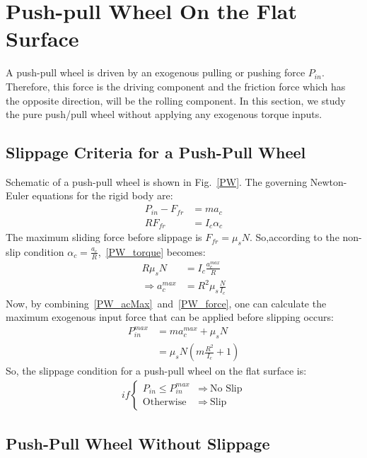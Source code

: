 \documentclass[letterpaper, 10pt, conference]{ieeeconf}
\begin{document}
\section{Push-pull Wheel On the Flat Surface}
A push-pull wheel is driven by an exogenous pulling or pushing force $P_{in}$. Therefore, this force is the driving component and the friction force which has the opposite direction, will be the rolling component. In this section, we study the pure push/pull wheel without applying any exogenous torque inputs.

\subsection{Slippage Criteria for a Push-Pull Wheel} \label{SlipCri-PW}

Schematic of a push-pull wheel is shown in Fig.~\ref{PW}.
The governing Newton-Euler equations for the rigid body are:
\begin{align}
P_{in} - F_{fr} &= ma_c \label{PW_force} \\
RF_{fr} &= I_c \alpha_c \label{PW_torque}
\end{align}
The maximum sliding force before slippage is $F_{fr} = \mu_sN$. So,according to the non-slip condition $\alpha_c = \frac{a_c}{R}$,~\eqref{PW_torque} becomes:
\begin{align}
R\mu_sN &= I_c \frac{a_c^{max}}{R} \\
\Rightarrow a_c^{max} &= R^2 \mu_s \frac{N}{I_c} \label{PW_acMax}
\end{align}
Now, by combining~\eqref{PW_acMax}~and~\eqref{PW_force}, one can calculate the maximum exogenous input force that can be applied before slipping occurs:
\begin{align}
P_{in}^{max} &= ma_c^{max} + \mu_sN \\
& = \mu_sN (m\frac{R^2}{I_c} + 1)
\end{align}
So, the slippage condition for a push-pull wheel on the flat surface is:
\begin{align}
if \begin{cases}
P_{in} \leqslant P_{in}^{max} &\Rightarrow \ \text{No Slip} \\
\text{Otherwise} &\Rightarrow \ \text{Slip}
\end{cases} \label{PW_slipCondition}
\end{align}
\subsection{Push-Pull Wheel Without Slippage}
\end{document}
